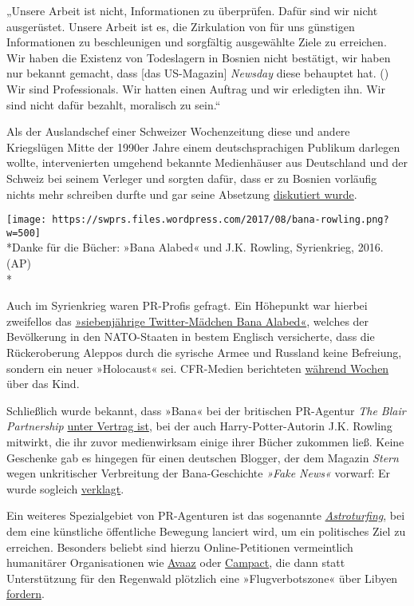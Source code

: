 „Unsere Arbeit ist nicht, Informationen zu überprüfen. Dafür sind wir
nicht ausgerüstet. Unsere Arbeit ist es, die Zirkulation von für uns
günstigen Informationen zu beschleunigen und sorgfältig ausgewählte
Ziele zu erreichen. Wir haben die Existenz von Todeslagern in Bosnien
nicht bestätigt, wir haben nur bekannt gemacht, dass {[}das
US-Magazin{]} \emph{Newsday} diese behauptet hat. () Wir sind
Professionals. Wir hatten einen Auftrag und wir erledigten ihn. Wir sind
nicht dafür bezahlt, moralisch zu sein.``

Als der Auslandschef einer Schweizer Wochen­zeitung diese und andere
Kriegslügen Mitte der 1990er Jahre einem deutsch­sprachigen Publikum
darlegen wollte, intervenierten umgehend bekannte Medien­häuser aus
Deutschland und der Schweiz bei seinem Verleger und sorgten dafür, dass
er zu Bosnien vorläufig nichts mehr schreiben durfte und gar seine
Absetzung \href{https://swprs.org/das-gewuenschte-narrativ/}{diskutiert
wurde}.

\texttt{[image: https://swprs.files.wordpress.com/2017/08/bana-rowling.png?w=500]}\\
*Danke für die Bücher: »Bana Alabed« und J.K. Rowling, Syrienkrieg,
2016. (AP)\\
*

Auch im Syrienkrieg waren PR-Profis gefragt. Ein Höhepunkt war hierbei
zweifellos das
\href{http://blauerbote.com/2017/07/05/bana-alabed-aus-aleppo/}{»siebenjährige
Twitter-Mädchen Bana Alabed«}, welches der Bevölkerung in den
NATO-Staaten in bestem Englisch versicherte, dass die Rückeroberung
Aleppos durch die syrische Armee und Russland keine Befreiung, sondern
ein neuer »Holocaust« sei. CFR-Medien berichteten
\href{https://www.rubikon.news/artikel/das-twittermadchen-aus-syrien}{während
Wochen} über das Kind.

Schließlich wurde bekannt, dass »Bana« bei der britischen PR-Agentur
\emph{The Blair Partnership}
\href{http://blauerbote.com/2017/04/23/bana-alabed-ist-klientin-der-londoner-pr-agentur-the-blair-partnership/}{unter
Vertrag ist}, bei der auch Harry-Potter-Autorin J.K. Rowling mitwirkt,
die ihr zuvor medienwirksam einige ihrer Bücher zukommen ließ. Keine
Geschenke gab es hingegen für einen deutschen Blogger, der dem Magazin
\emph{Stern} wegen unkritischer Verbreitung der Bana-Geschichte
\emph{»Fake News«} vorwarf: Er wurde sogleich
\href{http://blauerbote.com/2017/07/15/urteil-zu-gerichtsverfahren-gegen-marc-drewello-und-stern/}{verklagt}.

Ein weiteres Spezialgebiet von PR-Agenturen ist das sogenannte
\href{https://de.wikipedia.org/wiki/Astroturfing}{\emph{Astroturfing}},
bei dem eine künstliche öffentliche Bewegung lanciert wird, um ein
politisches Ziel zu erreichen. Besonders beliebt sind hierzu
Online-Petitionen vermeintlich humanitärer Organisationen wie
\href{http://www.nachdenkseiten.de/?p=35284}{Avaaz} oder
\href{http://www.nachdenkseiten.de/?p=35689}{Campact}, die dann statt
Unterstützung für den Regenwald plötzlich eine »Flug­verbots­zone« über
Libyen
\href{https://consortiumnews.com/2016/04/14/duping-progressives-into-wars/}{fordern}.

